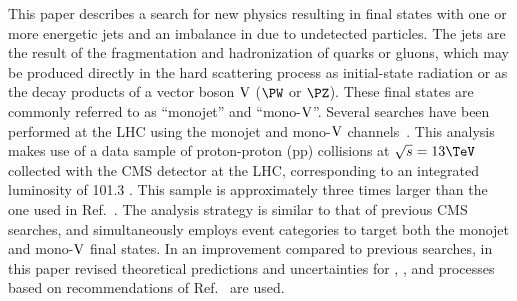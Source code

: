This paper describes a search for new physics resulting in final
states with one or more energetic jets and an imbalance in \pt
due to undetected particles. The jets are the result of the fragmentation and hadronization of
quarks or gluons, which may be produced directly in the hard scattering process as initial-state radiation or
as the decay products of a vector boson $\mathrm{V}$ ($\PW$ or $\PZ$).
These final states are commonly referred to as ``monojet'' and ``mono-$\mathrm{V}$''.
Several searches have been performed at the LHC using the
monojet and mono-$\mathrm{V}$ channels~\cite{Aad:2013oja,Khachatryan:2014rra,Aad:2015zva,Khachatryan:2016mdm,Aaboud:2016tnv,paper-exo-037,Aaboud:2017phn}.
This analysis makes use of a data sample of proton-proton
(pp) collisions at $\sqrt{s}=13\TeV$ collected with the
CMS detector at the LHC, corresponding to an integrated
luminosity of 101.3 \fbinv. This sample is approximately
three times larger than the one used in Ref.~\cite{Sirunyan:2017jix}.
The analysis strategy is similar to that of previous CMS searches, and simultaneously
employs event categories to target both the monojet and mono-$\mathrm{V}$ final states.
In an improvement compared to previous searches, in this paper revised theoretical predictions and uncertainties
for \phojets, \Zjets, and \Wjets processes based on recommendations of Ref.~\cite{DMTheory} are used.

